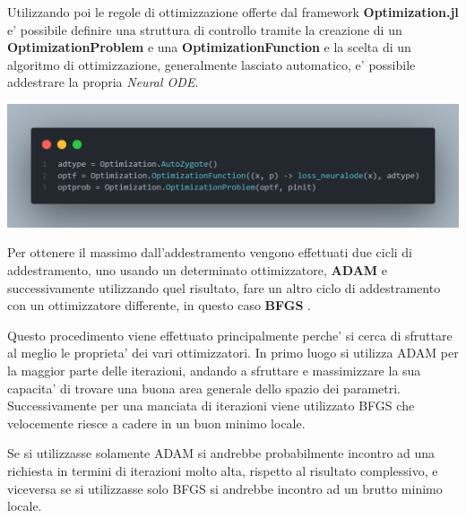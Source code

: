 Utilizzando poi le regole di ottimizzazione offerte dal framework \textbf{Optimization.jl} \cite{vaibhav_kumar_dixit_2023_7738525}
e' possibile definire una struttura di controllo tramite la creazione di un 
\textbf{OptimizationProblem} e una \textbf{OptimizationFunction} e la scelta di un 
algoritmo di ottimizzazione, generalmente lasciato automatico, e' possibile addestrare
la propria \emph{Neural ODE}.

\begin{minipage}{\linewidth}
	\centering
	\includegraphics[width=\textwidth]{img/optimization_functions.png}
	\label{fig:optimization_function}
\end{minipage}

Per ottenere il massimo dall'addestramento vengono effettuati due cicli di addestramento, 
uno usando un determinato ottimizzatore, \textbf{ADAM} e successivamente utilizzando quel 
risultato, fare un altro ciclo di addestramento con un ottimizzatore differente, in questo 
caso \textbf{BFGS} \cite{10.1093/imamat/6.1.76} \cite{10.1093/comjnl/13.3.317} 
\cite{35d0019d-775a-3628-b0b4-67be112e346b} \cite{e3177091-3094-3792-9d61-0ab445735ddb}.

Questo procedimento viene effettuato principalmente perche' si cerca di sfruttare al meglio le
proprieta' dei vari ottimizzatori. In primo luogo si utilizza ADAM per la maggior parte delle 
iterazioni, andando a sfruttare e massimizzare la sua capacita' di trovare una buona area 
generale dello spazio dei parametri. Successivamente per una manciata di iterazioni viene utilizzato 
BFGS che velocemente riesce a cadere in un buon minimo locale. 

Se si utilizzasse solamente ADAM si andrebbe probabilmente incontro ad una richiesta in 
termini di iterazioni molto alta, rispetto al risultato complessivo, e viceversa
se si utilizzasse solo BFGS si andrebbe incontro ad un brutto minimo locale.


